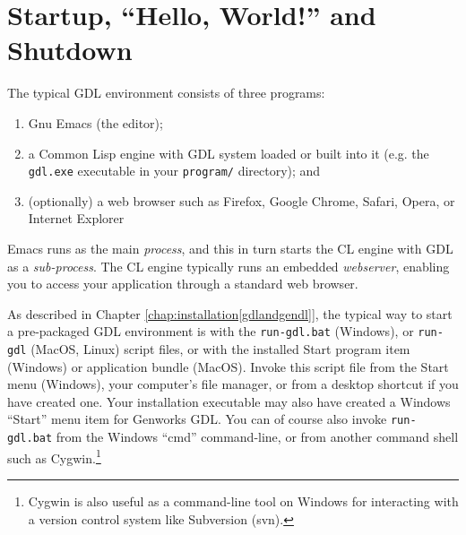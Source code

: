 \documentclass [11pt]{book}
\begin{document}
\section{Startup, ``Hello, World!'' and Shutdown}

\label{sec:startup,hello,world!andshutdown}



The typical GDL environment consists of three programs:

\begin{enumerate}

\item Gnu Emacs (the editor);

\item a Common Lisp engine with GDL system loaded or built into it (e.g. the \texttt{gdl.exe} executable in your \texttt{program/} directory); and

\item (optionally) a web browser such as Firefox, Google
Chrome, Safari, Opera, or Internet Explorer

\end{enumerate}

Emacs runs as the main \emph{process}, and this in turn starts the CL engine with GDL as a \emph{sub-process}. The CL engine typically runs an embedded \emph{webserver}, enabling you to access your application through a standard web browser.



As described in Chapter 
\ref{chap:installation[gdlandgendl]}, the typical way to start a pre-packaged GDL environment is with the \texttt{run-gdl.bat} (Windows), or \texttt{run-gdl} (MacOS, Linux) script files, or with the installed Start
program item (Windows) or application bundle (MacOS). Invoke this
script file from the Start menu (Windows), your computer's file
manager, or from a desktop shortcut if you have created one.  Your
installation executable may also have created a Windows ``Start'' menu
item for Genworks GDL. You can of course also invoke \texttt{run-gdl.bat} from the Windows ``cmd'' command-line, or from another command shell such as Cygwin.\footnote{Cygwin is also useful as a command-line tool on Windows
for interacting with a version control system like Subversion (svn).}
\end{document}
